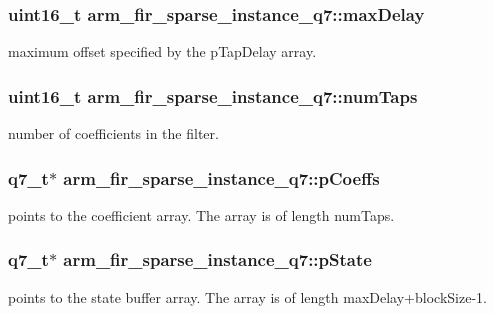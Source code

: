 \subsubsection[{\texorpdfstring{max\+Delay}{maxDelay}}]{\setlength{\rightskip}{0pt plus 5cm}uint16\+\_\+t arm\+\_\+fir\+\_\+sparse\+\_\+instance\+\_\+q7\+::max\+Delay}\hypertarget{structarm__fir__sparse__instance__q7_af74dacc1d34c078283e50f2530eb91df}{}\label{structarm__fir__sparse__instance__q7_af74dacc1d34c078283e50f2530eb91df}
maximum offset specified by the p\+Tap\+Delay array. 
\subsubsection[{\texorpdfstring{num\+Taps}{numTaps}}]{\setlength{\rightskip}{0pt plus 5cm}uint16\+\_\+t arm\+\_\+fir\+\_\+sparse\+\_\+instance\+\_\+q7\+::num\+Taps}\hypertarget{structarm__fir__sparse__instance__q7_a54cdd27ca1c672b126c38763ce678b1c}{}\label{structarm__fir__sparse__instance__q7_a54cdd27ca1c672b126c38763ce678b1c}
number of coefficients in the filter. 
\subsubsection[{\texorpdfstring{p\+Coeffs}{pCoeffs}}]{\setlength{\rightskip}{0pt plus 5cm}q7\+\_\+t$\ast$ arm\+\_\+fir\+\_\+sparse\+\_\+instance\+\_\+q7\+::p\+Coeffs}\hypertarget{structarm__fir__sparse__instance__q7_a3dac86f15e33553e8f3e19e0d712bae5}{}\label{structarm__fir__sparse__instance__q7_a3dac86f15e33553e8f3e19e0d712bae5}
points to the coefficient array. The array is of length num\+Taps. 
\subsubsection[{\texorpdfstring{p\+State}{pState}}]{\setlength{\rightskip}{0pt plus 5cm}q7\+\_\+t$\ast$ arm\+\_\+fir\+\_\+sparse\+\_\+instance\+\_\+q7\+::p\+State}\hypertarget{structarm__fir__sparse__instance__q7_a18072cf3ef3666d588f0d49512f2b28f}{}\label{structarm__fir__sparse__instance__q7_a18072cf3ef3666d588f0d49512f2b28f}
points to the state buffer array. The array is of length max\+Delay+block\+Size-\/1. 
